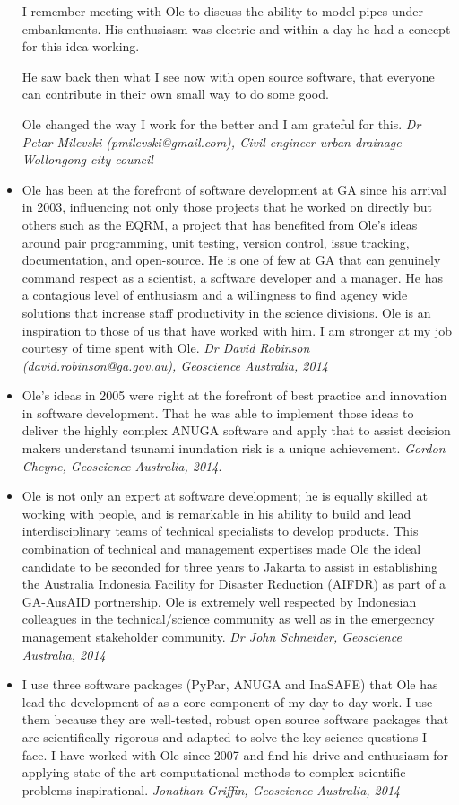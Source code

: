 \documentclass[11pt,a4paper]{article}
\begin{document}
\begin{itemize}
I remember meeting with Ole to discuss the ability to model pipes under embankments. His enthusiasm was electric and within a day he had a concept for this idea working.

He saw back then what I see now with open source software, that everyone can contribute in their own small way to do some good.

Ole changed the way I work for the better and I am grateful for this.
  \emph{Dr Petar Milevski (pmilevski@gmail.com), Civil engineer urban drainage Wollongong city council}

  \item Ole has been at the forefront of software development at GA since his arrival in 2003, influencing not only those projects that he worked on directly but others such as the EQRM, a project that has benefited from Ole’s ideas around pair programming, unit testing, version control, issue tracking, documentation, and open-source. He is one of few at GA that can genuinely command respect as a scientist, a software developer and a manager.  He has a contagious level of enthusiasm and a willingness to find agency wide solutions that increase staff productivity in the science divisions. Ole is an inspiration to those of us that have worked with him. I am stronger at my job courtesy of time spent with Ole.
  \emph{Dr David Robinson (david.robinson@ga.gov.au), Geoscience Australia, 2014}
  \item Ole’s ideas in 2005 were right at the forefront of best practice and innovation in software development. That he was able to implement those ideas to deliver the highly complex ANUGA software and apply that to assist decision makers understand tsunami inundation risk is a unique achievement. \emph{Gordon Cheyne, Geoscience Australia, 2014}.
  \item Ole is not only an expert at software development; he is equally skilled at working with people, and is remarkable in his ability to build and lead interdisciplinary teams of technical specialists to develop products. This combination of technical and management expertises made Ole the ideal candidate to be seconded for three years to Jakarta to assist in establishing the Australia Indonesia Facility for Disaster Reduction (AIFDR) as part of a GA-AusAID portnership. Ole is extremely well respected by Indonesian colleagues in the technical/science community as well as in the emergecncy management stakeholder community. \emph{Dr John Schneider, Geoscience Australia, 2014}
  \item I use three software packages (PyPar, ANUGA and InaSAFE) that Ole has lead the development of as a core component of my day-to-day work. I use them because they are well-tested, robust open source software packages that are scientifically rigorous and adapted to solve the key science questions I face. I have worked with Ole since 2007 and find his drive and enthusiasm for applying state-of-the-art computational methods to complex scientific problems inspirational. \emph{Jonathan Griffin, Geoscience Australia, 2014}

\end{itemize}
\end{document}
